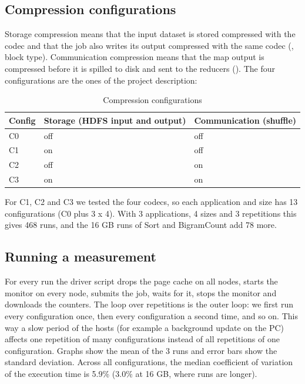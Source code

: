\documentclass[11pt,a4paper]{article}
\begin{document}
\subsection{Compression configurations}
Storage compression means that the input dataset is stored compressed with the codec and that the job also writes its output compressed with the same codec (, block type). Communication compression means that the map output is compressed before it is spilled to disk and sent to the reducers (). The four configurations are the ones of the project description:

\begin{table}[H]
  \centering
  \small
  \caption{Compression configurations}
  \begin{tabularx}{\linewidth}{lXl}
  \toprule
  \textbf{Config} & \textbf{Storage (HDFS input and output)} & \textbf{Communication (shuffle)} \\
  \midrule
  C0 & off & off \\
  C1 & on & off \\
  C2 & off & on \\
  C3 & on & on \\
  \bottomrule
  \end{tabularx}
\end{table}

For C1, C2 and C3 we tested the four codecs, so each application and size has 13 configurations (C0 plus 3 x 4). With 3 applications, 4 sizes and 3 repetitions this gives 468 runs, and the 16 GB runs of Sort and BigramCount add 78 more.

\subsection{Running a measurement}
For every run the driver script drops the page cache on all nodes, starts the monitor on every node, submits the job, waits for it, stops the monitor and downloads the counters. The loop over repetitions is the outer loop: we first run every configuration once, then every configuration a second time, and so on. This way a slow period of the hosts (for example a background update on the PC) affects one repetition of many configurations instead of all repetitions of one configuration. Graphs show the mean of the 3 runs and error bars show the standard deviation. Across all configurations, the median coefficient of variation of the execution time is 5.9\% (3.0\% at 16 GB, where runs are longer).
\end{document}
